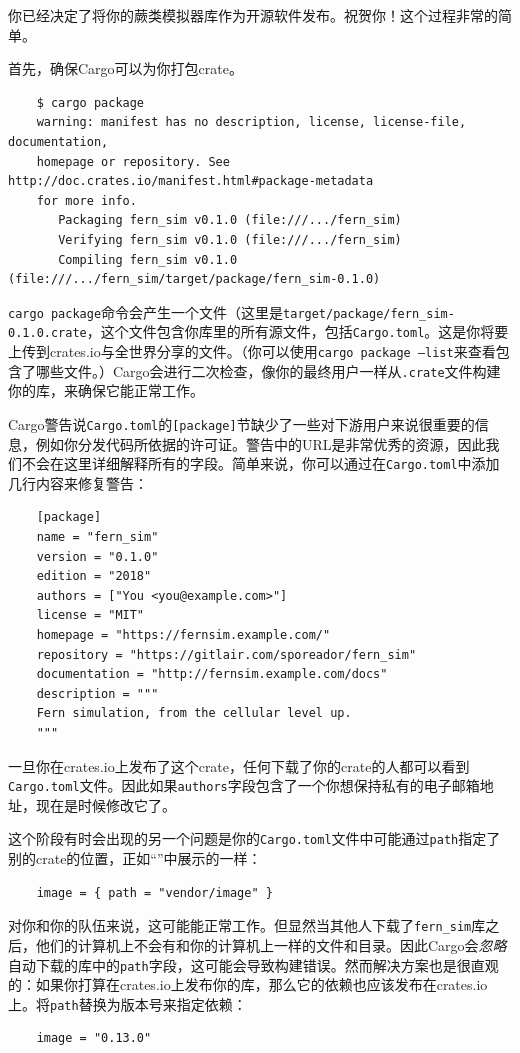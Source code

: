 你已经决定了将你的蕨类模拟器库作为开源软件发布。祝贺你！这个过程非常的简单。

首先，确保Cargo可以为你打包crate。

\begin{verbatim}
    $ cargo package
    warning: manifest has no description, license, license-file, documentation,
    homepage or repository. See http://doc.crates.io/manifest.html#package-metadata
    for more info.
       Packaging fern_sim v0.1.0 (file:///.../fern_sim)
       Verifying fern_sim v0.1.0 (file:///.../fern_sim)
       Compiling fern_sim v0.1.0 (file:///.../fern_sim/target/package/fern_sim-0.1.0)
\end{verbatim}

\texttt{cargo package}命令会产生一个文件（这里是\texttt{target/package/fern\_sim-0.1.0.crate}，这个文件包含你库里的所有源文件，包括\texttt{Cargo.toml}。这是你将要上传到crates.io与全世界分享的文件。（你可以使用\texttt{cargo package --list}来查看包含了哪些文件。）Cargo会进行二次检查，像你的最终用户一样从\texttt{.crate}文件构建你的库，来确保它能正常工作。

Cargo警告说\texttt{Cargo.toml}的\texttt{[package]}节缺少了一些对下游用户来说很重要的信息，例如你分发代码所依据的许可证。警告中的URL是非常优秀的资源，因此我们不会在这里详细解释所有的字段。简单来说，你可以通过在\texttt{Cargo.toml}中添加几行内容来修复警告：
\begin{verbatim}
    [package]
    name = "fern_sim"
    version = "0.1.0"
    edition = "2018"
    authors = ["You <you@example.com>"]
    license = "MIT"
    homepage = "https://fernsim.example.com/"
    repository = "https://gitlair.com/sporeador/fern_sim"
    documentation = "http://fernsim.example.com/docs"
    description = """
    Fern simulation, from the cellular level up.
    """
\end{verbatim}

\begin{note}
    一旦你在crates.io上发布了这个crate，任何下载了你的crate的人都可以看到\texttt{Cargo.toml}文件。因此如果\texttt{authors}字段包含了一个你想保持私有的电子邮箱地址，现在是时候修改它了。
\end{note}

这个阶段有时会出现的另一个问题是你的\texttt{Cargo.toml}文件中可能通过\texttt{path}指定了别的crate的位置，正如“”中展示的一样：
\begin{verbatim}
    image = { path = "vendor/image" }
\end{verbatim}

对你和你的队伍来说，这可能能正常工作。但显然当其他人下载了\texttt{fern\_sim}库之后，他们的计算机上不会有和你的计算机上一样的文件和目录。因此Cargo会\emph{忽略}自动下载的库中的\texttt{path}字段，这可能会导致构建错误。然而解决方案也是很直观的：如果你打算在crates.io上发布你的库，那么它的依赖也应该发布在crates.io上。将\texttt{path}替换为版本号来指定依赖：
\begin{verbatim}
    image = "0.13.0"
\end{verbatim}

